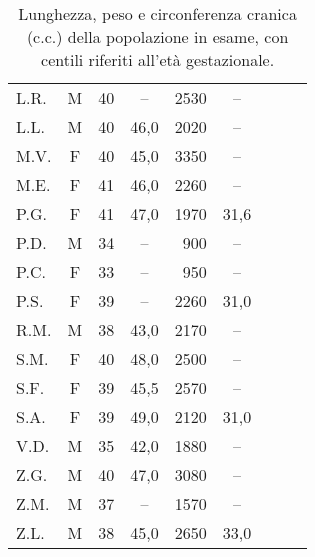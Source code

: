\begin{table}[!h]
\begin{center}
\begin{tabular}{lcccrcrrr}
L.R.	& M	& 40 & --   & 2530 & --     & & &  \\
L.L.	& M	& 40 & 46,0 & 2020 & --     & & &  \\
M.V.	& F	& 40 & 45,0 & 3350 & --     & & &  \\
M.E.	& F	& 41 & 46,0 & 2260 & --     & & &  \\
P.G.	& F	& 41 & 47,0 & 1970 & 31,6   & & &  \\
P.D.	& M	& 34 & --   &  900 & --     & &  \\
P.C.	& F	& 33 & --   &  950 & --     & & &  \\
P.S.	& F	& 39 & --   & 2260 & 31,0   & & &  \\
R.M.	& M	& 38 & 43,0 & 2170 & --     & & &  \\
S.M.	& F	& 40 & 48,0 & 2500 & --     & & &  \\
S.F.	& F	& 39 & 45,5 & 2570 & --     & & &  \\
S.A.	& F	& 39 & 49,0 & 2120 & 31,0   & & &  \\
V.D.	& M	& 35 & 42,0 & 1880 & --     & & &  \\
Z.G.	& M	& 40 & 47,0 & 3080 & --     & & &  \\
Z.M.	& M	& 37 & --   & 1570 & --     & & &  \\
Z.L.	& M	& 38 & 45,0 & 2650 & 33,0   & & &  \\
\bottomrule
\end{tabular}
\end{center}
\caption{Lunghezza, peso e circonferenza cranica (c.c.) della popolazione in esame, con centili riferiti all'età gestazionale.}
\label{tab:VariabiliNeonatali}
\end{table}

